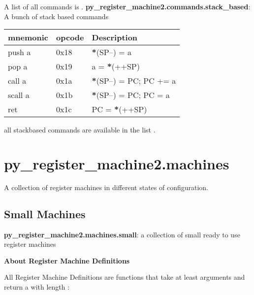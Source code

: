 \documentclass[letterpaper,10pt,english]{sphinxmanual}
\begin{document}
A list of all commands is .
\label{commands:module-py_register_machine2.commands.stack_based}
\textbf{py\_register\_machine2.commands.stack\_based}: A bunch of stack based commands

\begin{tabulary}{\linewidth}{|L|L|L|}
\hline
\textsf{\relax 
mnemonic
} & \textsf{\relax 
opcode
} & \textsf{\relax 
Description
}\\
\hline
push a
 & 
0x18
 & 
{\color{red}\bfseries{}*}(SP--) = a
\\
\hline
pop a
 & 
0x19
 & 
a = {\color{red}\bfseries{}*}(++SP)
\\
\hline
call a
 & 
0x1a
 & 
{\color{red}\bfseries{}*}(SP--) = PC; PC += a
\\
\hline
scall a
 & 
0x1b
 & 
{\color{red}\bfseries{}*}(SP--) = PC; PC = a
\\
\hline
ret
 & 
0x1c
 & 
PC = {\color{red}\bfseries{}*}(++SP)
\\
\hline\end{tabulary}


all stackbased commands are available in the list .


\chapter{py\_register\_machine2.machines}
\label{machines:py-register-machine2-machines}\label{machines::doc}
A collection of register machines in different states of configuration.


\section{Small Machines}
\label{machines:module-py_register_machine2.machines.small}\label{machines:small-machines}
\textbf{py\_register\_machine2.machines.small}: a collection of small ready to use register machines

\textbf{About Register Machine Definitions}

All Register Machine Definitions are functions that take at least  arguments and return
a  with length : 
\end{document}
